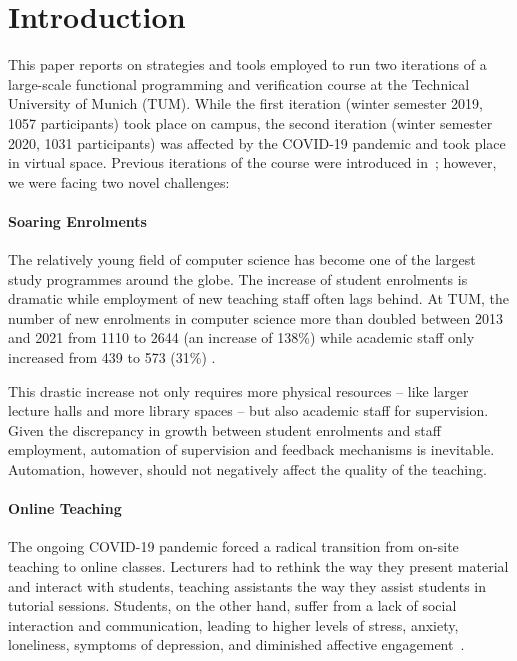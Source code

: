 \section{Introduction}\label{sec:intro}

This paper reports on strategies and tools employed to
run two iterations of a large-scale functional programming and verification course at the Technical University of Munich (TUM).
While the first iteration (winter semester 2019, 1057 participants)
took place on campus,
the second iteration (winter semester 2020, 1031 participants) was affected by the COVID-19 pandemic and took place in virtual space.
Previous iterations of the course were introduced in~\cite{next_1100};
however, we were facing two novel challenges:

\paragraph{Soaring Enrolments}
The relatively young field of computer science has
become one of the largest study programmes around the globe.
The increase of student enrolments is dramatic
\cite{comp_sci_growth1,comp_sci_growth2}
while employment of new teaching staff often lags behind.
At TUM, the number of new enrolments in computer science more than doubled between 2013 and 2021 from 1110 to 2644 (an increase of 138\%)
while academic staff only increased from 439 to 573 (31\%) \cite{tum_numbers}.

This drastic increase not only requires more physical resources -- like larger lecture halls and more library spaces --
but also academic staff for supervision.
Given the discrepancy in growth between student enrolments and staff employment,
automation of supervision and feedback mechanisms is inevitable.
Automation, however, should not
negatively affect the quality of the teaching.

\paragraph{Online Teaching}
The ongoing COVID-19 pandemic forced a radical
transition from on-site teaching to online classes.
Lecturers had to rethink the way they present material and interact with students,
teaching assistants the way they assist students in tutorial sessions.
Students, on the other hand, suffer from a lack of social interaction and communication, leading to higher
levels of stress, anxiety, loneliness, symptoms of depression, and diminished affective engagement~\cite{students_lockdown1,onlineengagement1}.

